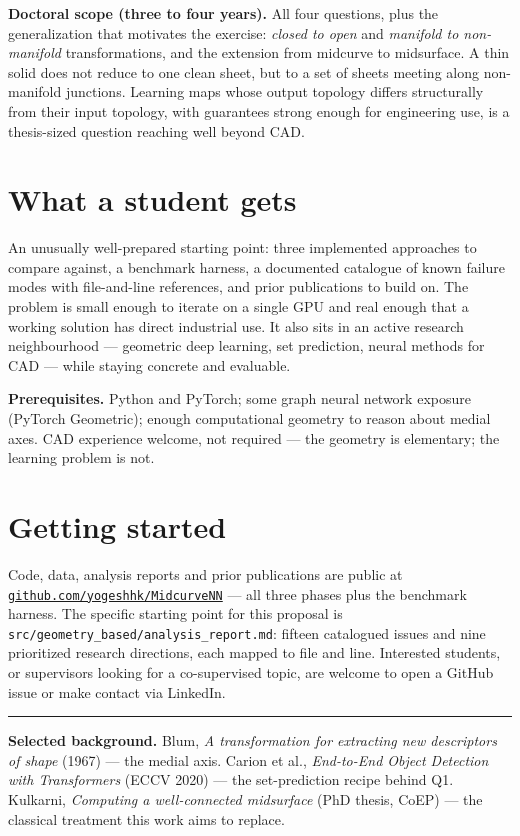 \documentclass[10pt,twocolumn]{article}
\begin{document}
\textbf{Doctoral scope (three to four years).} All four questions, plus the
generalization that motivates the exercise: \emph{closed to open} and
\emph{manifold to non-manifold} transformations, and the extension from
midcurve to midsurface. A thin solid does not reduce to one clean sheet, but to
a set of sheets meeting along non-manifold junctions. Learning maps whose
output topology differs structurally from their input topology, with guarantees
strong enough for engineering use, is a thesis-sized question reaching well
beyond CAD.

\section{What a student gets}

An unusually well-prepared starting point: three implemented approaches to
compare against, a benchmark harness, a documented catalogue of known failure
modes with file-and-line references, and prior publications to build on. The
problem is small enough to iterate on a single GPU and real enough that a
working solution has direct industrial use. It also sits in an active research
neighbourhood --- geometric deep learning, set prediction, neural methods for
CAD --- while staying concrete and evaluable.

\textbf{Prerequisites.} Python and PyTorch; some graph neural network exposure
(PyTorch Geometric); enough computational geometry to reason about medial axes.
CAD experience welcome, not required --- the geometry is elementary; the
learning problem is not.

\section{Getting started}

Code, data, analysis reports and prior publications are public at
\href{https://github.com/yogeshhk/MidcurveNN}{\texttt{github.com/yogeshhk/MidcurveNN}}
--- all three phases plus the benchmark harness. The specific starting point
for this proposal is \texttt{src/geometry\_based/analysis\_report.md}: fifteen
catalogued issues and nine prioritized research directions, each mapped to file
and line. Interested students, or supervisors looking for a co-supervised
topic, are welcome to open a GitHub issue or make contact via LinkedIn.

\vspace{4pt}
\hrule
\vspace{3pt}
{\footnotesize\noindent
\textbf{Selected background.}
Blum, \emph{A transformation for extracting new descriptors of shape} (1967)
--- the medial axis.\;
Carion et al., \emph{End-to-End Object Detection with Transformers} (ECCV 2020)
--- the set-prediction recipe behind Q1.\;
Kulkarni, \emph{Computing a well-connected midsurface} (PhD thesis, CoEP) ---
the classical treatment this work aims to replace.\par}
\end{document}
